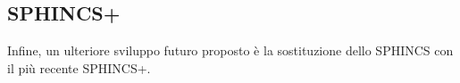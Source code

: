

\subsection{SPHINCS+}
Infine, un ulteriore sviluppo futuro proposto è la sostituzione dello SPHINCS con il più recente SPHINCS+.

